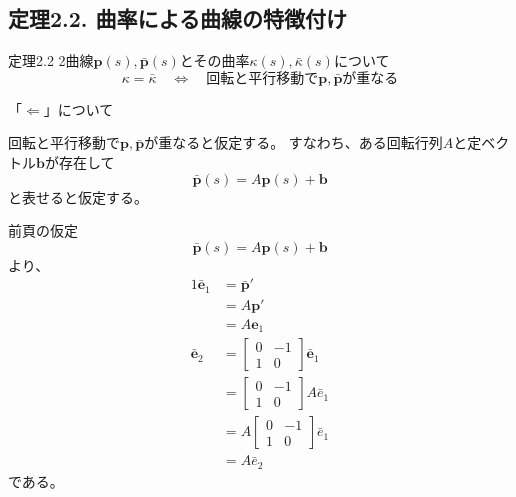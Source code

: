 \documentclass[a4j,disablejfam,dvipdfmx,papersize,slide,uplatex,21pt]{jsarticle}
\makeatletter
\renewenvironment{proof}[1][\proofname]{\par
        \pushQED{\qed}
        \normalfont
        \topsep6\p@\@plus6\p@ \trivlist
        \item[\hskip\labelsep{\bfseries #1}\@addpunct{\bfseries}]\ignorespaces
    }{%
        \popQED\endtrivlist\@endpefalse
    }
\renewcommand{\proofname}{証明.}
\makeatother
\begin{document}
\newpage
\subsection*{定理2.2. 曲率による曲線の特徴付け}
\begin{itembox}[l]{定理2.2}
    2曲線$\bm{p}(s), \bar{\bm{p}}(s)$とその曲率$\kappa(s), \bar{\kappa}(s)$について
    \begin{equation}
        \kappa = \bar{\kappa}
        \quad \Longleftrightarrow \quad
        \text{回転と平行移動で$\bm{p}, \bar{\bm{p}}$が重なる}
    \end{equation}
\end{itembox}

\begin{proof}
    「$\Leftarrow$」について

    回転と平行移動で$\bm{p}, \bar{\bm{p}}$が重なると仮定する。
    すなわち、ある回転行列$A$と定ベクトル$\bm{b}$が存在して
    \begin{equation}
        \bar{\bm{p}}(s) = A \bm{p}(s) + \bm{b}
    \end{equation}
    と表せると仮定する。

    \newpage
    前頁の仮定
    \begin{equation}
        \bar{\bm{p}}(s) = A \bm{p}(s) + \bm{b}
    \end{equation}
    より、
    \begin{alignat}{1}
        \bar{\bm{e}}_1 &= \bar{\bm{p}}' \\
            &= A \bm{p}' \\
            &= A \bm{e}_1 \\
        \bar{\bm{e}}_2
            &=
                \left[
                    \begin{array}{cc}
                        0 & -1 \\
                        1 & 0
                    \end{array}
                \right]
                \bar{\bm{e}}_1 \\
            &=
                \left[
                    \begin{array}{cc}
                        0 & -1 \\
                        1 & 0
                    \end{array}
                \right]
                A \bar{e}_1 \\
            &=
                A \left[
                    \begin{array}{cc}
                        0 & -1 \\
                        1 & 0
                    \end{array}
                \right]
                \bar{e}_1 \\
            &= A \bar{e}_2
    \end{alignat}
    である。


\end{proof}
\end{document}
